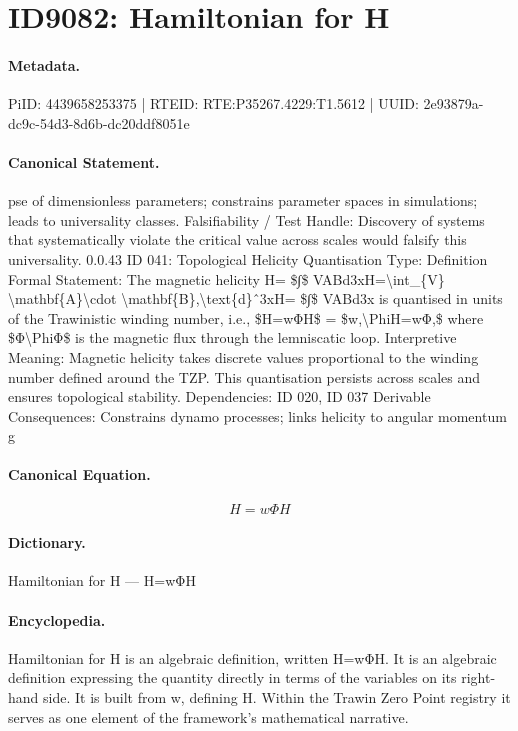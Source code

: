 \section*{ID9082: Hamiltonian for H}
\paragraph{Metadata.}
PiID: 4439658253375 | RTEID: RTE:P35267.4229:T1.5612 | UUID: 2e93879a-dc9c-54d3-8d6b-dc20ddf8051e

\paragraph{Canonical Statement.}
pse of dimensionless parameters; constrains parameter spaces in simulations; leads to universality classes. Falsifiability / Test Handle: Discovery of systems that systematically violate the critical value across scales would falsify this universality. 0.0.43 ID 041: Topological Helicity Quantisation Type: Definition Formal Statement: The magnetic helicity H= \$∫\$ VABd3xH=\textbackslash{}int\_\{V\} \textbackslash{}mathbf\{A\}\textbackslash{}cdot \textbackslash{}mathbf\{B\},\textbackslash{}text\{d\}ˆ3xH= \$∫\$ VABd3x is quantised in units of the Trawinistic winding number, i.e., \$H=wΦH\$ = \$w,\textbackslash{}PhiH=wΦ,\$ where \$Φ\textbackslash{}PhiΦ\$ is the magnetic flux through the lemniscatic loop. Interpretive Meaning: Magnetic helicity takes discrete values proportional to the winding number defined around the TZP. This quantisation persists across scales and ensures topological stability. Dependencies: ID 020, ID 037 Derivable Consequences: Constrains dynamo processes; links helicity to angular momentum g

\paragraph{Canonical Equation.}
\[
H=wΦH
\]

\paragraph{Dictionary.}
Hamiltonian for H — H=wΦH

\paragraph{Encyclopedia.}
Hamiltonian for H is an algebraic definition, written H=wΦH. It is an algebraic definition expressing the quantity directly in terms of the variables on its right-hand side. It is built from w, defining H. Within the Trawin Zero Point registry it serves as one element of the framework's mathematical narrative.
